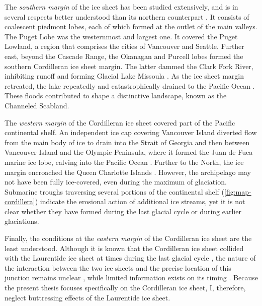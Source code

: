 \documentclass[a4paper]{kappa}
\begin{document}
The \emph{southern margin} of the ice sheet has been studied extensively, and
is in several respects better understood than its northern counterpart
\citep{Booth.etal.2003}. It consists of coalescent piedmont lobes, each of
which formed at the outlet of the main valleys. The Puget Lobe
\citep{Thorson.1980, Porter.Swanson.1998} was the westernmost and largest one.
It covered the Puget Lowland, a region that comprises the cities of Vancouver
and Seattle. Further east, beyond the Cascade Range, the Okanagan and Purcell
lobes formed the southern Cordilleran ice sheet margin. The latter dammed
the Clark Fork River, inhibiting runoff and forming Glacial Lake Missoula
\citep{Pardee.1910}. As the ice sheet margin retreated, the lake repeatedly and
catastrophically drained to the Pacific Ocean \citep{Bretz.1923,Waitt.1980}.
These floods contributed to shape a distinctive landscape, known as the
Channeled Scabland.

The \emph{western margin} of the Cordilleran ice sheet covered part of the
Pacific continental shelf. An independent ice cap covering Vancouver Island
diverted flow from the main body of ice to drain into the Strait of Georgia and
then between Vancouver Island and the Olympic Peninsula, where it formed the
Juan de Fuca marine ice lobe, calving into the Pacific Ocean
\citep{Herzer.Bornhold.1982}. Further to the North, the ice margin encroached
the Queen Charlotte Islands \citep{Blaise.etal.1990}. However, the
archipelago may not have been fully ice-covered, even during the maximum of
glaciation. Submarine troughs traversing several portions of the continental
shelf (\cref{fig:map-cordillera}) indicate the erosional action of additional
ice streams, yet it is not
clear whether they have formed during the last glacial cycle or during earlier
glaciations.

Finally, the conditions at the \emph{eastern margin} of the Cordilleran ice
sheet are the least understood. Although it is known that the Cordilleran ice
sheet collided with the Laurentide ice sheet at times during the last glacial
cycle \citep[e.g.][]{Margold.etal.2013, Margold.etal.2013a}, the nature of the
interaction between the two ice sheets and the precise location of this
junction remains unclear \citep{Gowan.2013}, while limited information exists
on its timing \citep[e.g.,][]{Jackson.etal.1997, Bednarski.Smith.2007}. Because
the present thesis focuses specifically on the Cordilleran ice sheet, I,
therefore, neglect buttressing effects of the Laurentide ice sheet.
\end{document}

